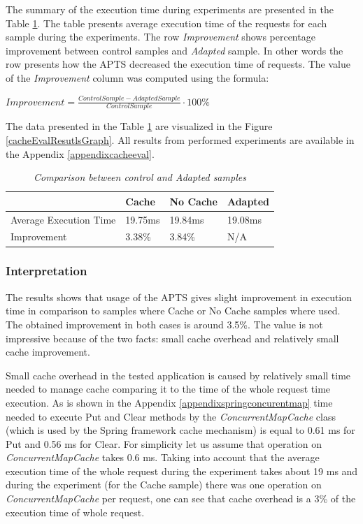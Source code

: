 \documentclass[12pt,a4paper]{article}
\begin{document}
The summary of the execution time during experiments are presented in the Table \ref{cacheCompResutls}. The table presents average execution time of the requests for each sample during the experiments. The row \textit{Improvement} shows percentage improvement between control samples and \textit{Adapted} sample. In other words the row presents how the APTS decreased the execution time of requests. The value of the \textit{Improvement} column was computed using the formula: 

\begin{center}
$Improvement = \frac{ControlSample - AdaptedSample}{ControlSample} \cdot 100\%$
\end{center}

The data presented in the Table \ref{cacheCompResutls} are visualized in the Figure \ref{cacheEvalResutlsGraph}.  All results from performed experiments are available in the Appendix \ref{appendixcacheeval}. 

\begin{table}[!htb]
\caption{\textit{Comparison between control and Adapted samples}} \label{cacheCompResutls}
\begin{tabularx}{\textwidth}{p{4cm}|X|X|X}
 & \textbf{Cache} & \textbf{No Cache} & \textbf{Adapted} \\ \hline
Average Execution Time &  19.75ms & 19.84ms & 19.08ms\\ \hline
Improvement &  3.38\% & 3.84\% & N/A\\ 
\end{tabularx}
\end{table}

\subsubsection{Interpretation} 

The results shows that usage of the APTS gives slight improvement in execution time in comparison to samples where Cache or No Cache samples where used. The obtained improvement in both cases is around 3.5\%. The value is not impressive because of the two facts: small cache overhead and relatively small cache improvement. 

Small cache overhead in the tested application is caused by relatively small time needed to manage cache comparing it to the time of the whole request time execution. As is shown in the Appendix \ref{appendixspringconcurentmap} time needed to execute Put and Clear methods by the \textit{ConcurrentMapCache} class (which is used by the Spring framework cache mechanism) is equal to 0.61 ms for Put and 0.56 ms for Clear. For simplicity let us assume that operation on \textit{ConcurrentMapCache} takes 0.6 ms. Taking into account that the average execution time of the whole request during the experiment takes about 19 ms and during the experiment (for the Cache sample) there was one operation on \textit{ConcurrentMapCache} per request, one can see that cache overhead is a 3\% of the execution time of whole request.  
\end{document}
